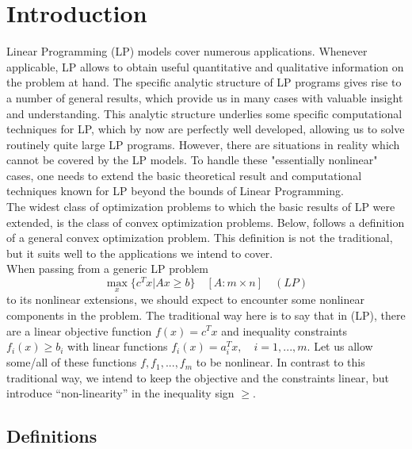 \documentclass[12pt]{article}
\begin{document}
\section{Introduction}  	
  	 Linear Programming (LP) models cover numerous applications. Whenever applicable, LP allows to obtain useful quantitative and qualitative information on the problem at hand. The specific analytic structure of LP programs gives rise to a number of general results, which provide us in many cases with valuable insight and understanding. This analytic structure underlies some specific computational techniques for LP, which by now are perfectly well developed, allowing us to solve routinely quite large LP programs. However, there are situations in reality which cannot be covered by the LP models. To handle these "essentially nonlinear" cases, one needs to extend the basic theoretical result and computational techniques known for LP beyond the bounds of Linear Programming.\\
  	The widest class of optimization problems to which the basic results of LP were extended, is the class of convex optimization problems. Below, follows a definition of a general convex optimization problem. This definition is not the traditional, but it suits well to the applications we intend to cover.\\ 
  	When passing from a generic LP problem 
  	$$\max\limits_{x} \{ c^T x | Ax \geq b \} \quad [A: m \times n] \quad (LP)$$
  	to its nonlinear extensions, we should expect to encounter some nonlinear components in the
    problem. The traditional way here is to say that in (LP), there are a linear objective function $f(x) = c^T x$ and inequality constraints $f_i (x) \geq b_i$ with linear functions $f_i (x) = a_i^T x,\quad i = 1, ..., m$. Let us allow some/all of these functions $f, f_1 , ..., f_ m$ to be nonlinear. In contrast to this traditional way, we intend to keep the objective and the constraints linear, but introduce “non-linearity” in the inequality sign $\geq$.
    \subsection{Definitions}
    
\end{document}
